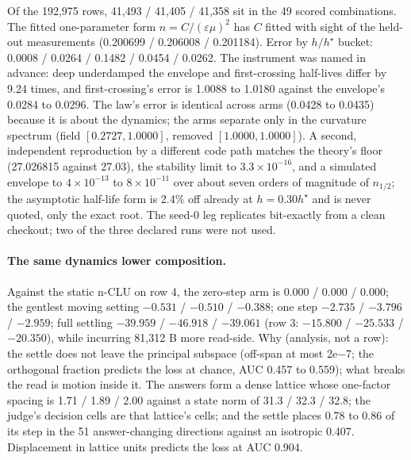 \documentclass{article} %
\newcommand{\sci}[2]{\ensuremath{#1\times10^{#2}}}
\begin{document}
\noindent Of the 192,975 rows, 41,493 / 41,405 / 41,358 sit in the 49 scored combinations. The fitted
one-parameter form $n=C/(\varepsilon\mu)^2$ has $C$ fitted with sight of the held-out measurements
(0.200699 / 0.206008 / 0.201184). %
Error by $h/h^\star$ bucket: 0.0008 / 0.0264 / 0.1482 / 0.0454 / 0.0262. The instrument was named in
advance: deep underdamped the envelope and first-crossing half-lives differ by 9.24 times, and
first-crossing's error is 1.0088 to 1.0180 against the envelope's 0.0284 to 0.0296.
The law's error is identical across arms (0.0428 to 0.0435) because it is about the dynamics; the
arms separate only in the curvature spectrum (field $[0.2727, 1.0000]$, removed $[1.0000, 1.0000]$).
A second, independent reproduction by a different code path matches the theory's floor
(27.026815 against 27.03), the stability limit to \sci{3.3}{-16}, and a simulated envelope to
\sci{4}{-13} to \sci{8}{-11} over about seven orders of magnitude of $n_{1/2}$; the asymptotic
half-life form is 2.4\% off already at $h=0.30h^\star$ and is never quoted, only the exact root.
The seed-0 leg replicates bit-exactly from a clean checkout; two of the three declared runs
were not used. %

\paragraph{The same dynamics lower composition.} Against the static n-CLU on row 4, the zero-step
arm is $0.000$ / $0.000$ / $0.000$; the gentlest moving setting $-0.531$ / $-0.510$ / $-0.388$; one
step $-2.735$ / $-3.796$ / $-2.959$; full settling $-39.959$ / $-46.918$ / $-39.061$ (row 3:
$-15.800$ / $-25.533$ / $-20.350$), while incurring 81,312 B more read-side.
Why (analysis, not a row): the settle does not leave the principal subspace (off-span at most
2e$-$7; the orthogonal fraction predicts the loss at chance, AUC 0.457 to 0.559); what breaks the
read is motion inside it. The answers form a dense lattice whose one-factor spacing is 1.71 / 1.89 /
2.00 against a state norm of 31.3 / 32.3 / 32.8; the judge's decision cells are that lattice's
cells; and the settle places 0.78 to 0.86 of its step in the 51 answer-changing directions against
an isotropic 0.407. Displacement in lattice units predicts the loss at AUC 0.904.
\end{document}
